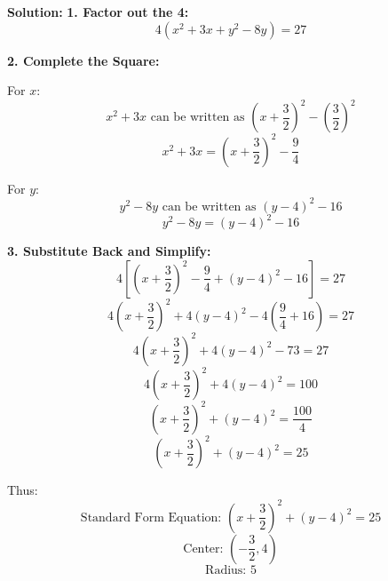\documentclass{article}
\begin{document}
\textbf{Solution:}
\textbf{1. Factor out the 4:}
\[
4(x^2 + 3x + y^2 - 8y) = 27
\]

\textbf{2. Complete the Square:}

For \(x\):
\[
x^2 + 3x \text{ can be written as } (x + \frac{3}{2})^2 - \left(\frac{3}{2}\right)^2
\]
\[
x^2 + 3x = (x + \frac{3}{2})^2 - \frac{9}{4}
\]

For \(y\):
\[
y^2 - 8y \text{ can be written as } (y - 4)^2 - 16
\]
\[
y^2 - 8y = (y - 4)^2 - 16
\]

\textbf{3. Substitute Back and Simplify:}
\[
4 \left[(x + \frac{3}{2})^2 - \frac{9}{4} + (y - 4)^2 - 16\right] = 27
\]
\[
4 (x + \frac{3}{2})^2 + 4 (y - 4)^2 - 4 \left(\frac{9}{4} + 16\right) = 27
\]
\[
4 (x + \frac{3}{2})^2 + 4 (y - 4)^2 - 73 = 27
\]
\[
4 (x + \frac{3}{2})^2 + 4 (y - 4)^2 = 100
\]
\[
(x + \frac{3}{2})^2 + (y - 4)^2 = \frac{100}{4}
\]
\[
(x + \frac{3}{2})^2 + (y - 4)^2 = 25
\]

Thus:
\[
\text{Standard Form Equation: } \boxed{(x + \frac{3}{2})^2 + (y - 4)^2 = 25}
\]
\[
\text{Center: } \boxed{\left(-\frac{3}{2}, 4\right)}
\]
\[
\text{Radius: } \boxed{5}
\]
\end{document}
